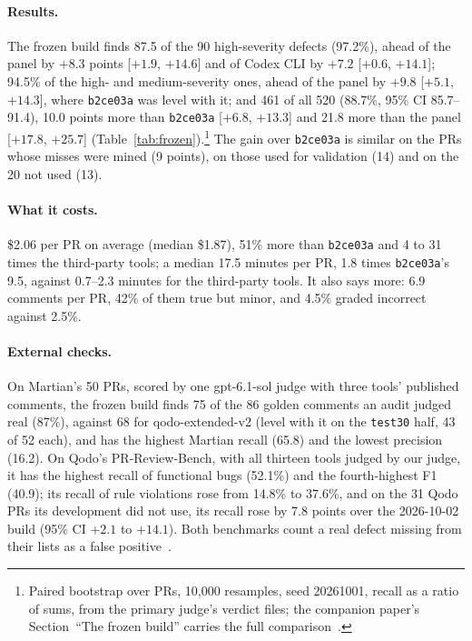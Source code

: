 \documentclass[11pt,a4paper]{article}
\newcommand{\code}[1]{\texttt{#1}}
\begin{document}
\paragraph{Results.} The frozen build finds 87.5 of the 90 high-severity
defects (97.2\%), ahead of the panel by $+8.3$ points [$+1.9$, $+14.6$] and
of Codex CLI by $+7.2$ [$+0.6$, $+14.1$]; 94.5\% of the high- and
medium-severity ones, ahead of the panel by $+9.8$ [$+5.1$, $+14.3$], where
\code{b2ce03a} was level with it; and 461 of all 520 (88.7\%, 95\% CI
85.7--91.4), 10.0 points more than \code{b2ce03a} [$+6.8$, $+13.3$] and 21.8
more than the panel [$+17.8$, $+25.7$] (Table~\ref{tab:frozen}).\footnote{Paired
bootstrap over PRs, 10{,}000 resamples, seed 20261001, recall as a ratio of
sums, from the primary judge's verdict files; the companion paper's
Section~``The frozen build'' carries the full comparison~\cite{qcrbench}.}
The gain over \code{b2ce03a} is similar on the PRs whose misses were mined
(9 points), on those used for validation (14) and on the 20 not used (13).

\paragraph{What it costs.} \$2.06 per PR on average (median \$1.87), 51\%
more than \code{b2ce03a} and 4 to 31 times the third-party tools; a median
17.5 minutes per PR, 1.8 times \code{b2ce03a}'s 9.5, against 0.7--2.3
minutes for the third-party tools. It also says more: 6.9 comments per PR,
42\% of them true but minor, and 4.5\% graded incorrect against 2.5\%.

\paragraph{External checks.} On Martian's 50 PRs, scored by one
gpt-6.1-sol judge with three tools' published comments, the frozen build
finds 75 of the 86 golden comments an audit judged real (87\%), against 68
for qodo-extended-v2 (level with it on the \code{test30} half, 43 of 52
each), and has the highest Martian recall (65.8) and the lowest precision
(16.2). On Qodo's PR-Review-Bench, with all thirteen tools judged by our judge, it
has the highest recall of functional bugs (52.1\%) and the fourth-highest F1
(40.9); its recall of rule violations rose from 14.8\% to 37.6\%, and on the
31 Qodo PRs its development did not use, its recall rose by 7.8 points over
the 2026-10-02 build (95\% CI $+2.1$ to $+14.1$). Both benchmarks count a
real defect missing from their lists as a false positive~\cite{qcrbench}.
\end{document}
